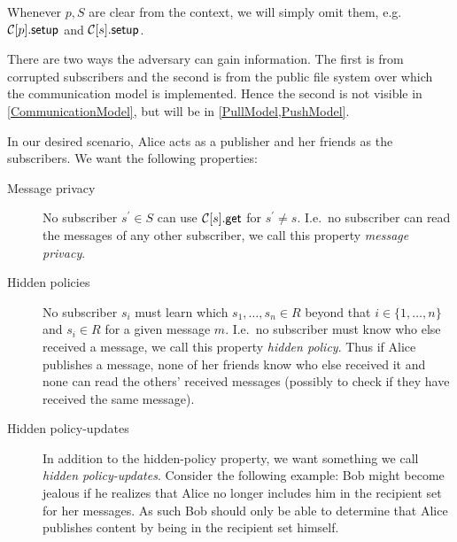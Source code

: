 Whenever \(p, S\) are clear from the context, we will simply omit them, e.g.\ 
\(\csetup{p}\) and \(\csetup{s}\).

There are two ways the adversary can gain information.
The first is from corrupted subscribers and the second is from the public file 
system over which the communication model is implemented.
Hence the second is not visible in \cref{CommunicationModel}, but will be in 
\cref{PullModel,PushModel}.

In our desired scenario, Alice acts as a publisher and her friends as the 
subscribers.
We want the following properties:
\begin{description}
  \item[Message privacy]
    No subscriber \(s^\prime\in S\) can use \(\cget{s}\) for \(s^\prime\neq s\).
    I.e.\ no subscriber can read the messages of any other subscriber, we call 
    this property \emph{message privacy}.

  \item[Hidden policies]
    No subscriber \(s_i\) must learn which \(s_1, \ldots, s_n\in R\) beyond 
    that \(i\in \{1, \ldots, n\}\) and \(s_i\in R\) for a given message \(m\).
    I.e.\ no subscriber must know who else received a message, we call this 
    property \emph{hidden policy}.
    Thus if Alice publishes a message, none of her friends know who else 
    received it and none can read the others' received messages (possibly to 
    check if they have received the same message).


  \item[Hidden policy-updates]
    In addition to the hidden-policy property, we want something we call 
    \emph{hidden policy-updates}.
    Consider the following example:
    Bob might become jealous if he realizes that Alice no longer includes him 
    in the recipient set for her messages.
    As such Bob should only be able to determine that Alice publishes content 
    by being in the recipient set himself.
\end{description}

